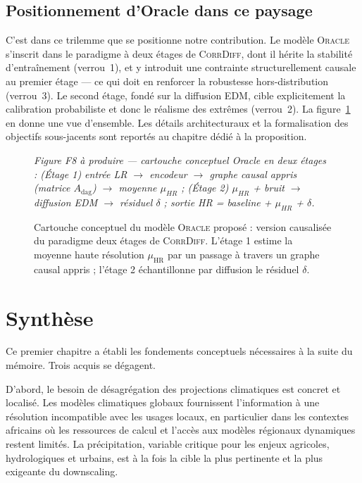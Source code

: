 \documentclass[14pt,a4paper,openany]{extreport}
\theoremstyle{definition}
\newcommand{\Oracle}{\textsc{Oracle}}
\newcommand{\CorrDiff}{\textsc{CorrDiff}}
\newcommand{\HR}{\ensuremath{\text{HR}}}
\newcommand{\muHR}{\ensuremath{\mu_{\HR}}}
\newcommand{\figplaceholder}[2][0.9\linewidth]{%
  \begin{tcolorbox}[width=#1,height=5cm,valign=center,colback=gray!8,colframe=gray!45,arc=2pt,boxrule=0.5pt]
    \centering\small\textit{#2}
  \end{tcolorbox}%
}
\begin{document}
\subsection{Positionnement d'Oracle dans ce paysage}
\label{ssec:positionnement-oracle}

C'est dans ce trilemme que se positionne notre contribution. Le modèle \Oracle{} s'inscrit dans le paradigme à deux étages de \CorrDiff{}, dont il hérite la stabilité d'entraînement (verrou~1), et y introduit une contrainte structurellement causale au premier étage --- ce qui doit en renforcer la robustesse hors-distribution (verrou~3). Le second étage, fondé sur la diffusion EDM, cible explicitement la calibration probabiliste et donc le réalisme des extrêmes (verrou~2). La figure~\ref{fig:cartouche-oracle} en donne une vue d'ensemble. Les détails architecturaux et la formalisation des objectifs sous-jacents sont reportés au chapitre dédié à la proposition.

\begin{figure}[ht]
  \centering
  \figplaceholder{Figure F8 à produire --- cartouche conceptuel Oracle en deux étages : (Étage 1) entrée LR $\to$ encodeur $\to$ graphe causal appris (matrice $A_{\mathrm{dag}}$) $\to$ moyenne $\mu_{HR}$ ; (Étage 2) $\mu_{HR}$ + bruit $\to$ diffusion EDM $\to$ résiduel $\delta$ ; sortie HR = baseline + $\mu_{HR}$ + $\delta$.}
  \caption{Cartouche conceptuel du modèle \Oracle{} proposé : version causalisée du paradigme deux étages de \CorrDiff{}. L'étage 1 estime la moyenne haute résolution $\muHR$ par un passage à travers un graphe causal appris ; l'étage 2 échantillonne par diffusion le résiduel $\delta$.}
  \label{fig:cartouche-oracle}
\end{figure}

\section{Synthèse}
\label{sec:synthese}

Ce premier chapitre a établi les fondements conceptuels nécessaires à la suite du mémoire. Trois acquis se dégagent.

D'abord, le besoin de désagrégation des projections climatiques est concret et localisé. Les modèles climatiques globaux fournissent l'information à une résolution incompatible avec les usages locaux, en particulier dans les contextes africains où les ressources de calcul et l'accès aux modèles régionaux dynamiques restent limités. La précipitation, variable critique pour les enjeux agricoles, hydrologiques et urbains, est à la fois la cible la plus pertinente et la plus exigeante du downscaling.
\end{document}
